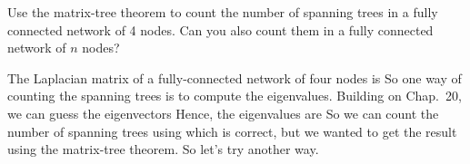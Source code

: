 Use the matrix-tree theorem to count the number of spanning trees in a fully connected network of 4 nodes. Can you also count them in a fully connected network of $n$ nodes?

\solution 
The Laplacian matrix of a fully-connected network of four nodes is 
So one way of counting the spanning trees is to compute the eigenvalues. Building on Chap.~20, we can guess the eigenvectors 
Hence, the eigenvalues are 
So we can count the number of spanning trees using
which is correct, but we wanted to get the result using the matrix-tree theorem. So let's try another way. 

